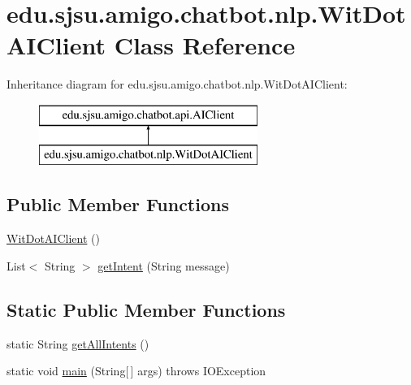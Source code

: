 \hypertarget{classedu_1_1sjsu_1_1amigo_1_1chatbot_1_1nlp_1_1_wit_dot_a_i_client}{}\section{edu.\+sjsu.\+amigo.\+chatbot.\+nlp.\+Wit\+Dot\+A\+I\+Client Class Reference}
\label{classedu_1_1sjsu_1_1amigo_1_1chatbot_1_1nlp_1_1_wit_dot_a_i_client}
Inheritance diagram for edu.\+sjsu.\+amigo.\+chatbot.\+nlp.\+Wit\+Dot\+A\+I\+Client\+:\begin{figure}[H]
\begin{center}
\leavevmode
\includegraphics[height=2.000000cm]{classedu_1_1sjsu_1_1amigo_1_1chatbot_1_1nlp_1_1_wit_dot_a_i_client}
\end{center}
\end{figure}
\subsection*{Public Member Functions}
\begin{DoxyCompactItemize}
\item 
\hyperlink{classedu_1_1sjsu_1_1amigo_1_1chatbot_1_1nlp_1_1_wit_dot_a_i_client_a77b4b9220a55ef469f241cd14ca59a4a}{Wit\+Dot\+A\+I\+Client} ()
\item 
List$<$ String $>$ \hyperlink{classedu_1_1sjsu_1_1amigo_1_1chatbot_1_1nlp_1_1_wit_dot_a_i_client_aa0e6e4f924089e29165ec44f7b7f54ee}{get\+Intent} (String message)
\end{DoxyCompactItemize}
\subsection*{Static Public Member Functions}
\begin{DoxyCompactItemize}
\item 
static String \hyperlink{classedu_1_1sjsu_1_1amigo_1_1chatbot_1_1nlp_1_1_wit_dot_a_i_client_a4935436d8b868a953b3572764374d803}{get\+All\+Intents} ()
\item 
static void \hyperlink{classedu_1_1sjsu_1_1amigo_1_1chatbot_1_1nlp_1_1_wit_dot_a_i_client_a554f5008f6927345c92e47a1f6fe1d39}{main} (String\mbox{[}$\,$\mbox{]} args)  throws I\+O\+Exception 
\end{DoxyCompactItemize}

